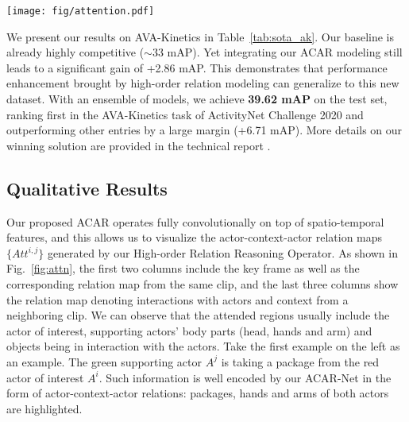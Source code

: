 \begin{figure*}[t]
\centering
\texttt{[image: fig/attention.pdf]}
\caption{\textbf{Visualization of actor-context-actor attention maps on AVA.} \textcolor{red}{Actors of interest} are marked in red and \textcolor{green}{supporting actors} in green. Heat maps illustrate the context regions' attention weights $Att^{i,j}$ from actor-context-actor relation reasoning. We observe that our model has learned to attend to useful relations between actors and context, and the context serves as the bridge for connecting actors.
\label{fig:attn}}
\vspace{-4mm}
\end{figure*}



We present our results on AVA-Kinetics in Table~\ref{tab:sota_ak}. Our baseline is already highly competitive ($\sim$33 mAP). Yet integrating our ACAR modeling still leads to a significant gain of +2.86 mAP. This demonstrates that performance enhancement brought by high-order relation modeling can generalize to this new dataset.
With an ensemble of models, we achieve \textbf{39.62 mAP} on the test set, ranking first in the AVA-Kinetics task of ActivityNet Challenge 2020 and outperforming other entries by a large margin (+6.71 mAP). More details on our winning solution are provided in the technical report \cite{chen20201st}.











\subsection{Qualitative Results} 

Our proposed ACAR operates fully convolutionally on top of spatio-temporal features, and this allows us to visualize the actor-context-actor relation maps $\{Att^{i,j}\}$ generated by our High-order Relation Reasoning Operator. As shown in Fig.~\ref{fig:attn}, the first two columns include the key frame as well as the corresponding relation map from the same clip, and the last three columns show the relation map denoting interactions with actors and context from a neighboring clip.
We can observe that the attended regions usually include the actor of interest, supporting actors' body parts (\ie head, hands and arm) and objects being in interaction with the actors. Take the first example on the left as an example. The green supporting actor $A^j$ is taking a package from the red actor of interest $A^i$. Such information is well encoded by our ACAR-Net in the form of actor-context-actor relations: packages, hands and arms of both actors are highlighted.






%
